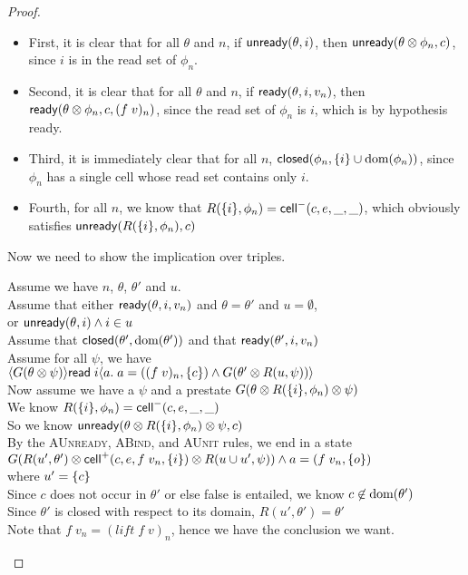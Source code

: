 \begin{proof}
\begin{itemize}
\item First, it is clear that for all $\theta$ and $n$, if $\mathsf{unready}({\theta}, {i})$, then $\mathsf{unready}({\theta \otimes \phi_n}, {c})$, since $i$ is in the read set of $\phi_n$. 
\item Second, it is clear that for all $\theta$ and $n$, if $\mathsf{ready}({\theta}, {i}, {v_n})$, then $\mathsf{ready}({\theta \otimes \phi_n}, {c}, {(f\;v)_n})$, since the read set of $\phi_n$ is $i$, which is by hypothesis ready. 
\item Third, it is immediately clear that for all $n$, $\mathsf{closed}({\phi_n}, {\{{i}\} \cup \mbox{dom}({\phi_n})})$,
since $\phi_n$ has a single cell whose read set contains only $i$. 
\item Fourth, for all $n$, we know that $R(\{{i}\}, \phi_n) = \mathsf{cell}^{-}({c}, {e}, {\_}, {\_})$, which obviously satisfies $\mathsf{unready}({R(\{{i}\}, \phi_n)}, {c})$ 
\end{itemize}
Now we need to show the implication over triples. 
\begin{tabbedproof}
\oo Assume we have $n$, $\theta$, $\theta'$ and $u$. \\
\oo Assume that either $\mathsf{ready}({\theta}, {i}, {v_n})$ and $\theta = \theta'$ and $u = \emptyset$,  \\
\oo or $\mathsf{unready}({\theta}, {i}) \land i \in u$ \\
\oo Assume that $\mathsf{closed}({\theta'}, {\mbox{dom}({\theta'})})$ and that $\mathsf{ready}({\theta'}, {i}, {v_n})$ \\
\oo Assume for all $\psi$, we have \\
\ox  $\langle{G(\theta \otimes \psi)}\rangle{\mathsf{read}\;i}\langle{a}.\;{a = ((f\;v)_n, \{{c}\}) 
      \land G(\theta' \otimes R(u,\psi))}\rangle$ \\
\oo Now assume we have a $\psi$ and a prestate $G(\theta \otimes R(\{{i}\}, \phi_n) \otimes \psi)$ \\
\oo We know $R(\{{i}\}, \phi_n) = \mathsf{cell}^{-}({c}, {e}, {\_}, {\_})$ \\
\oo So we know $\mathsf{unready}({\theta \otimes R(\{{i}\}, \phi_n) \otimes \psi}, {c})$ \\
\oo By the \textsc{AUnready}, \textsc{ABind}, and \textsc{AUnit} rules, we end in a state \\
\oo $G(R(u',\theta') \otimes \mathsf{cell}^{+}({c}, {e}, {f\;v_n}, {\{{i}\}}) \otimes R(u \cup u',\psi)) \land a = (f\;v_n, \{{o}\})$ \\
\oo where $u' = \{{c}\}$ \\
\oo Since $c$ does not occur in $\theta'$ or else false is entailed, we know $c \not\in \mbox{dom}({\theta'})$ \\
\oo Since $\theta'$ is closed with respect to its domain, $R(u',\theta') = \theta'$ \\
\oo Note that $f\;v_n = (\mathit{lift}\;f\;v)_n$, hence we have the conclusion we want. \\
\end{tabbedproof}

\end{proof}

